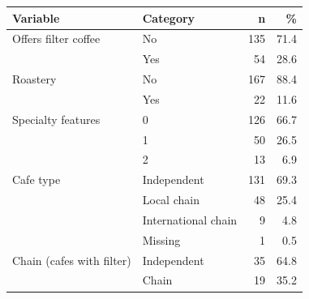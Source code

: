 \begin{tabular}{llrr}
\toprule
Variable & Category & n & \% \\
\midrule
Offers filter coffee & No & 135 & 71.4 \\
 & Yes &  54 & 28.6 \\
Roastery & No & 167 & 88.4 \\
 & Yes &  22 & 11.6 \\
Specialty features & 0 & 126 & 66.7 \\
 & 1 &  50 & 26.5 \\
 & 2 &  13 & 6.9 \\
Cafe type & Independent & 131 & 69.3 \\
 & Local chain &  48 & 25.4 \\
 & International chain &   9 & 4.8 \\
 & Missing &   1 & 0.5 \\
Chain (cafes with filter) & Independent &  35 & 64.8 \\
 & Chain &  19 & 35.2 \\
\bottomrule
\end{tabular}
